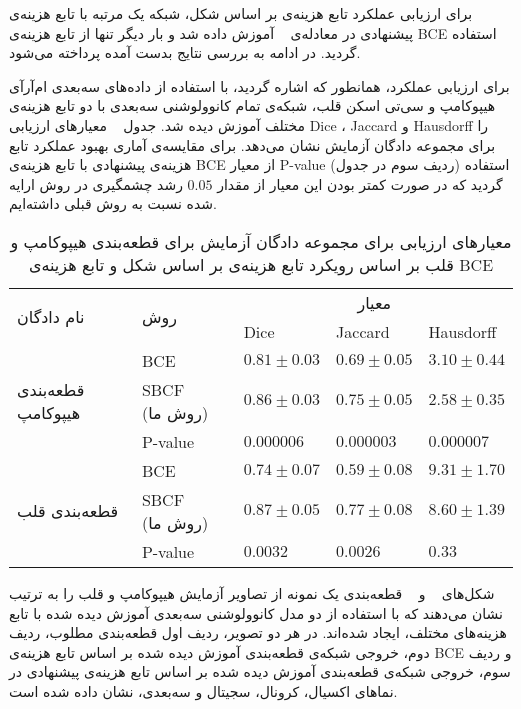 برای ارزیابی عملکرد تابع هزینه‌ی بر اساس شکل، شبکه یک‌ مرتبه با تابع هزینه‌ی پیشنهادی در معادله‌ی ~ آموزش داده شد و بار دیگر تنها از تابع هزینه‌ی BCE استفاده گردید. در ادامه به بررسی نتایج بدست آمده پرداخته می‌شود.

برای ارزیابی عملکرد، همانطور که اشاره گردید، با استفاده از داده‌های سه‌بعدی ام‌آرآی هیپوکامپ و سی‌تی اسکن قلب، شبکه‌ی تمام کانوولوشنی سه‌بعدی با دو تابع هزینه‌ی مختلف آموزش دیده شد. جدول ~ معیارهای ارزیابی Dice ، Jaccard و Hausdorff را برای مجموعه دادگان آزمایش نشان می‌دهد. برای مقایسه‌ی آماری بهبود عملکرد تابع هزینه‌ی پیشنهادی با تابع هزینه‌ی BCE از معیار P-value (ردیف سوم در جدول) استفاده گردید که در صورت کمتر بودن این معیار از مقدار $0.05$ رشد چشمگیری در روش‌ ارایه شده نسبت به روش قبلی داشته‌ایم.



\begin{table}[H]
	\caption{معیارهای ارزیابی برای مجموعه دادگان آزمایش برای قطعه‌بندی هیپوکامپ و قلب بر اساس رویکرد تابع هزینه‌ی بر اساس شکل و تابع هزینه‌ی BCE}
	\label{sbcftable}
\begin{tabular}{lllll}
	\hline
	\multirow{2}{*}{نام دادگان}                  & \multirow{2}{*}{روش} & \multicolumn{3}{c}{معیار}                 \\ \cline{3-5} 
	&                         & Dice      & Jaccard   & Hausdorff  \\ \hline
	\multirow{3}{*}{قطعه‌بندی هیپوکامپ} & BCE                 & $0.81\pm0.03$ & $0.69\pm0.05$ & $3.10\pm0.44$          \\ \cline{2-5} 
	& SBCF (روش ما)             & $0.86\pm0.03$ & $0.75\pm0.05$ & $2.58\pm0.35$          \\ \cline{2-5} 
	& P-value                 & $0.000006$  & $0.000003$  & $0.000007$           \\ \hline
	\multirow{3}{*}{قطعه‌بندی قلب}       & BCE                & $0.74\pm0.07$ & $0.59\pm0.08$ & $9.31\pm1.70$          \\ \cline{2-5} 
	& SBCF (روش ما)             & $0.87\pm0.05$ & $0.77\pm0.08$ & $8.60\pm1.39$          \\ \cline{2-5} 
	& P-value                 & $0.0032$    & $0.0026$    & $0.33 $              \\ \hline
\end{tabular}
\end{table}

شکل‌های ~ و ~ قطعه‌بندی یک نمونه از تصاویر آزمایش هیپوکامپ و قلب را به ترتیب نشان می‌دهند که با استفاده از دو مدل کانوولوشنی سه‌بعدی آموزش دیده شده با تابع هزینه‌های مختلف، ایجاد شده‌اند. در هر دو تصویر، ردیف اول قطعه‌بندی مطلوب، ردیف دوم، خروجی شبکه‌ی قطعه‌بندی آموزش دیده شده بر اساس تابع هزینه‌ی BCE و ردیف سوم، خروجی شبکه‌ی قطعه‌بندی آموزش دیده شده بر اساس تابع هزینه‌ی پیشنهادی در نماهای اکسیال، کرونال، سجیتال و سه‌بعدی، نشان داده شده است.


